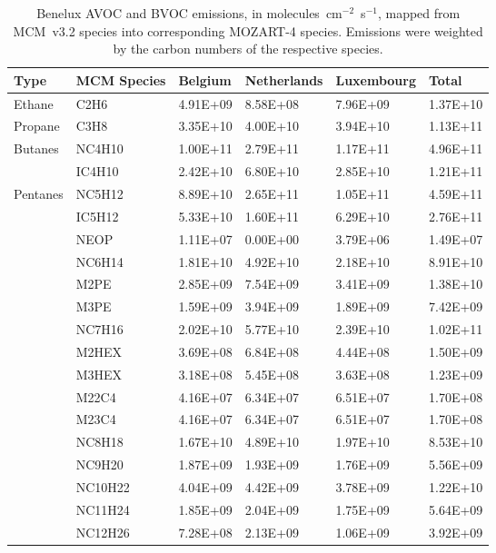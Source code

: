 \footnotesize
\begin{longtable}{llllll}
	\caption{Benelux AVOC and BVOC emissions, in molecules~cm$^{-2}$~s$^{-1}$, mapped from MCM~v3.2 species into corresponding MOZART-4 species. Emissions were weighted by the carbon numbers of the respective species.}\\%
	\hline \hline
	\textbf{Type} & \textbf{MCM Species} & \textbf{Belgium} & \textbf{Netherlands} & \textbf{Luxembourg} & \textbf{Total}\\
	\endhead
	\hline
	Ethane & C2H6 & 4.91E+09 & 8.58E+08 & 7.96E+09 & 1.37E+10 \\
	\hline Propane & C3H8 & 3.35E+10 & 4.00E+10 & 3.94E+10 & 1.13E+11 \\ \hline
	\multirow{2}{*}{Butanes} & NC4H10 & 1.00E+11 & 2.79E+11 & 1.17E+11 & 4.96E+11 \\
	 & IC4H10 & 2.42E+10 & 6.80E+10 & 2.85E+10 & 1.21E+11 \\
	\hline \multirow{3}{*}{Pentanes} & NC5H12 & 8.89E+10 & 2.65E+11 & 1.05E+11 & 4.59E+11 \\
	 & IC5H12 & 5.33E+10 & 1.60E+11 & 6.29E+10 & 2.76E+11 \\
	 & NEOP & 1.11E+07 & 0.00E+00 & 3.79E+06 & 1.49E+07 \\
	\hline \parbox[t]{2mm}{} & NC6H14 & 1.81E+10 & 4.92E+10 & 2.18E+10 & 8.91E+10 \\
	 & M2PE & 2.85E+09 & 7.54E+09 & 3.41E+09 & 1.38E+10 \\
	 & M3PE & 1.59E+09 & 3.94E+09 & 1.89E+09 & 7.42E+09 \\
	 & NC7H16 & 2.02E+10 & 5.77E+10 & 2.39E+10 & 1.02E+11 \\
	 & M2HEX & 3.69E+08 & 6.84E+08 & 4.44E+08 & 1.50E+09 \\
	 & M3HEX & 3.18E+08 & 5.45E+08 & 3.63E+08 & 1.23E+09 \\
	 & M22C4 & 4.16E+07 & 6.34E+07 & 6.51E+07 & 1.70E+08 \\
	 & M23C4 & 4.16E+07 & 6.34E+07 & 6.51E+07 & 1.70E+08 \\
	 & NC8H18 & 1.67E+10 & 4.89E+10 & 1.97E+10 & 8.53E+10 \\
	 & NC9H20 & 1.87E+09 & 1.93E+09 & 1.76E+09 & 5.56E+09 \\
	 & NC10H22 & 4.04E+09 & 4.42E+09 & 3.78E+09 & 1.22E+10 \\
	 & NC11H24 & 1.85E+09 & 2.04E+09 & 1.75E+09 & 5.64E+09 \\
	 & NC12H26 & 7.28E+08 & 2.13E+09 & 1.06E+09 & 3.92E+09 \\

\end{longtable}
